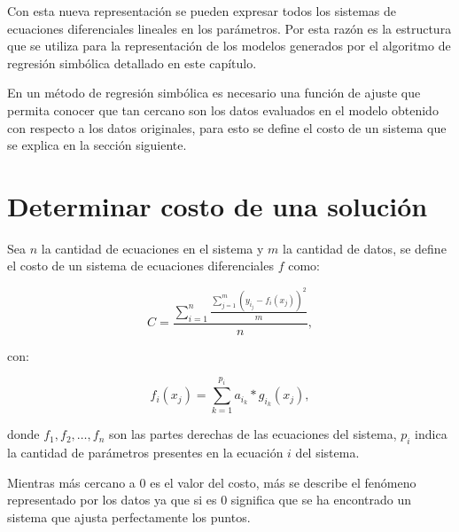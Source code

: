 \begin{center}
\end{center}

Con esta nueva representación se pueden expresar todos los sistemas de ecuaciones diferenciales lineales en los parámetros. Por esta razón es la estructura que se utiliza para la representación de los modelos generados por el algoritmo de regresión simbólica detallado en este capítulo.

En un método de regresión simbólica es necesario una función de ajuste que permita conocer que tan cercano son los datos evaluados en el modelo obtenido con respecto a los datos originales, para esto se define el costo de un sistema que se explica en la sección siguiente.

\section{Determinar costo de una solución}

Sea $n$ la cantidad de ecuaciones en el sistema y $m$ la cantidad de datos, se define el costo de un sistema de ecuaciones diferenciales $f$ como:

$$C = \frac{\sum_{i=1}^n\frac{\sum_{j=1}^{m}(y_{i_j} - f_i(x_j))^2}{m}}{n},$$

con:

$$f_i(x_j) = \sum_{k=1}^{p_i} a_{i_k} * g_{i_k}(x_j),$$

donde $f_1, f_2, \dots, f_n$ son las partes derechas de las ecuaciones del sistema, $p_i$ indica la cantidad de parámetros presentes en la ecuación $i$ del sistema.

Mientras más cercano a 0 es el valor del costo, más se describe el fenómeno representado por los datos ya que si es 0 significa que se ha encontrado un sistema que ajusta perfectamente los puntos.

